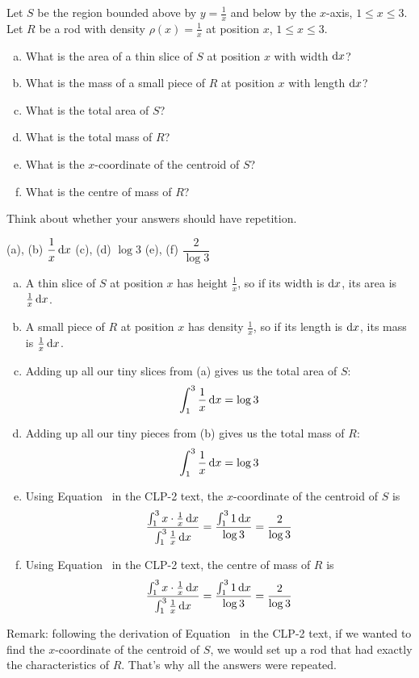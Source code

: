 \begin{question}
Let $S$ be the region bounded above by $y=\frac{1}{x}$ and below by the $x$-axis, $1 \le x \le 3$. Let $R$ be a rod with density $\rho(x)=\frac{1}{x}$ at position $x$, $1 \le x \le 3$.
\begin{enumerate}[(a)]
\item What is the area of a thin slice of $S$ at position $x$ with width $\mathrm{d}x$?
\item What is the mass of a small piece of $R$ at position $x$ with length $\mathrm{d}x$?
\item What is the total area of $S$?
\item What is the total mass of $R$?
\item What is the $x$-coordinate of the centroid of $S$?
\item What is the centre of mass of $R$?
\end{enumerate}
\end{question}
\begin{hint}
Think about whether your answers should have repetition.
\end{hint}
\begin{answer}
(a), (b) $\dfrac{1}{x}\,\mathrm{d}x$\qquad
(c), (d) $\log 3$\qquad
(e), (f) $\dfrac{2}{\log 3}$
\end{answer}
\begin{solution}
\begin{enumerate}[(a)]
\item A thin slice of $S$ at position $x$ has height $\frac{1}{x}$, so if its width is $\mathrm{d}x$, its area is $\frac{1}{x}\,\mathrm{d}x$.
\item A small piece of $R$ at position $x$ has density $\frac{1}{x}$, so if its length is $\mathrm{d}x$, its mass is $\frac{1}{x}\,\mathrm{d}x$.
\item Adding up all our tiny slices from (a) gives us the total area of $S$:
\[\int_1^3 \frac{1}{x}\,\mathrm{d}x = \log 3\]
\item Adding up all our tiny pieces from (b) gives us the total mass of $R$:
\[\int_1^3 \frac{1}{x}\,\mathrm{d}x=\log 3\]
\item Using Equation~ in the CLP-2 text,
 the $x$-coordinate of the centroid of $S$ is
 \[\frac{\int_1^3 x\cdot\frac{1}{x}\,\mathrm{d}x}{\int_1^3\frac{1}{x}\,\mathrm{d}x} = \frac{\int_1^3 1\,\mathrm{d}x}{\log 3} = \frac{2}{\log 3}\]
\item Using Equation~ in the CLP-2 text,
 the centre of mass of $R$ is
 \[\frac{\int_1^3 x\cdot\frac{1}{x}\,\mathrm{d}x}{\int_1^3\frac{1}{x}\,\mathrm{d}x} = \frac{\int_1^3 1\,\mathrm{d}x}{\log 3} = \frac{2}{\log 3}\]
\end{enumerate}
Remark: following the derivation of Equation~ in the CLP-2 text,
if we wanted to find the $x$-coordinate of the centroid of $S$, we would set up a rod that had exactly the characteristics of $R$. That's why all the answers were repeated.
\end{solution}

